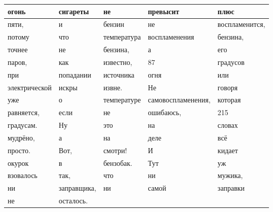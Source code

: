\documentclass{article}
\begin{document}
\begin{center}
\begin{tabular}{ | m{10em} | m{10em} | m{10em} | m{10em} | m{10em} | }
	\hline
	огонь & сигареты & не & превысит & плюс \\
	\hline
	пяти, & и & бензин & не & воспламенится, \\
	\hline
	потому & что & температура & воспламенения & бензина, \\
	\hline
	точнее & не & бензина, & а & его \\
	\hline
	паров, & как & известно, & 87 & градусов \\
	\hline
	при & попадании & источника & огня & или \\
	\hline
	электрической & искры & извне. & Не & говоря \\
	\hline
	уже & о & температуре & самовоспламенения, & которая \\
	\hline
	равняется, & если & не & ошибаюсь, & 215 \\
	\hline
	градусам. & Ну & это & на & словах \\
	\hline
	мудрёно, & а & на & деле & всё \\
	\hline
	просто. & Вот, & смотри! & И & кидает \\
	\hline
	окурок & в & бензобак. & Тут & уж \\
	\hline
	взовалось & так, & что & ни & мужика, \\
	\hline
	ни & заправщика, & ни & самой & заправки \\
	\hline
	не & осталось. \\

\hline
\end{tabular}
\end{center}
\end{document}
